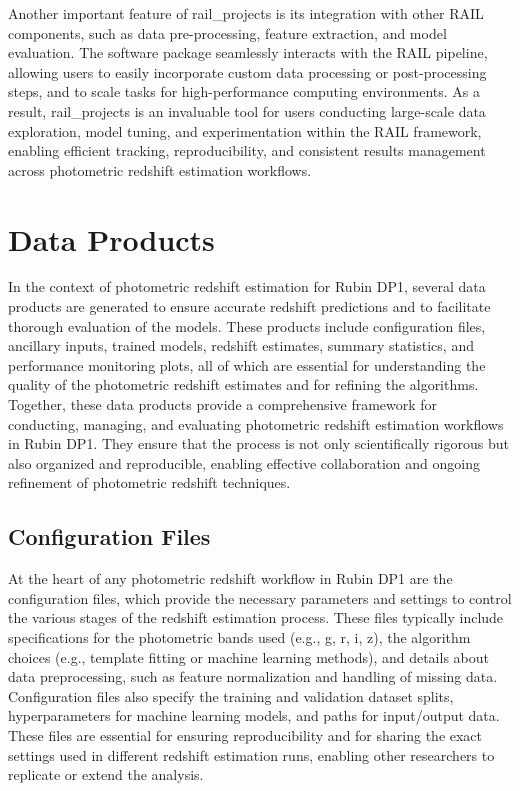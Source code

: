Another important feature of rail\_projects is its integration with other RAIL components, such as data pre-processing, feature extraction, and model evaluation. The software package seamlessly interacts with the RAIL pipeline, allowing users to easily incorporate custom data processing or post-processing steps, and to scale tasks for high-performance computing environments. As a result, rail\_projects is an invaluable tool for users conducting large-scale data exploration, model tuning, and experimentation within the RAIL framework, enabling efficient tracking, reproducibility, and consistent results management across photometric redshift estimation workflows.



\section{Data Products}
\label{sec:products:0}

In the context of photometric redshift estimation for Rubin DP1, several data products are generated to ensure accurate redshift predictions and to facilitate thorough evaluation of the models. These products include configuration files, ancillary inputs, trained models, redshift estimates, summary statistics, and performance monitoring plots, all of which are essential for understanding the quality of the photometric redshift estimates and for refining the algorithms.   Together, these data products provide a comprehensive framework for conducting, managing, and evaluating photometric redshift estimation workflows in Rubin DP1. They ensure that the process is not only scientifically rigorous but also organized and reproducible, enabling effective collaboration and ongoing refinement of photometric redshift techniques.


\subsection{Configuration Files}
\label{sec: products:configuration}

At the heart of any photometric redshift workflow in Rubin DP1 are the configuration files, which provide the necessary parameters and settings to control the various stages of the redshift estimation process. These files typically include specifications for the photometric bands used (e.g., g, r, i, z), the algorithm choices (e.g., template fitting or machine learning methods), and details about data preprocessing, such as feature normalization and handling of missing data.  Configuration files also specify the training and validation dataset splits, hyperparameters for machine learning models, and paths for input/output data. These files are essential for ensuring reproducibility and for sharing the exact settings used in different redshift estimation runs, enabling other researchers to replicate or extend the analysis.

